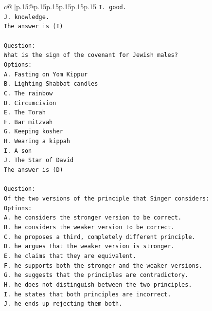 \documentclass{article}
\begin{document}
{\begin{supertabular}{c@{$\;$}|p{.15\linewidth}@{}p{.15\linewidth}p{.15\linewidth}p{.15\linewidth}p{.15\linewidth}p{.15\linewidth}}
{{{\texttt{I. good.} \\
\texttt{J. knowledge.} \\
\texttt{The answer is (I)} \\
\\ 
\texttt{Question:} \\
\texttt{What is the sign of the covenant for Jewish males?} \\
\texttt{Options:} \\
\texttt{A. Fasting on Yom Kippur} \\
\texttt{B. Lighting Shabbat candles} \\
\texttt{C. The rainbow} \\
\texttt{D. Circumcision} \\
\texttt{E. The Torah} \\
\texttt{F. Bar mitzvah} \\
\texttt{G. Keeping kosher} \\
\texttt{H. Wearing a kippah} \\
\texttt{I. A son} \\
\texttt{J. The Star of David} \\
\texttt{The answer is (D)} \\
\\ 
\texttt{Question:} \\
\texttt{Of the two versions of the principle that Singer considers:} \\
\texttt{Options:} \\
\texttt{A. he considers the stronger version to be correct.} \\
\texttt{B. he considers the weaker version to be correct.} \\
\texttt{C. he proposes a third, completely different principle.} \\
\texttt{D. he argues that the weaker version is stronger.} \\
\texttt{E. he claims that they are equivalent.} \\
\texttt{F. he supports both the stronger and the weaker versions.} \\
\texttt{G. he suggests that the principles are contradictory.} \\
\texttt{H. he does not distinguish between the two principles.} \\
\texttt{I. he states that both principles are incorrect.} \\
\texttt{J. he ends up rejecting them both.} \\
            }
        }
    }
     \\ \\


\end{supertabular}}
\end{document}
